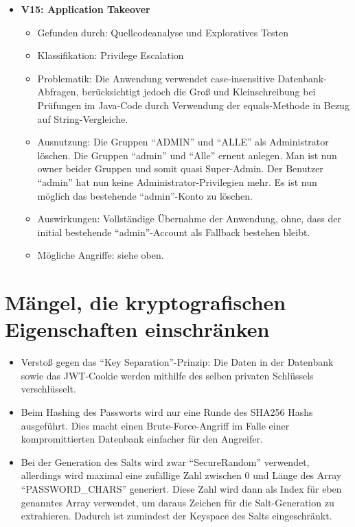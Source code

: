 \documentclass[12pt,DIV14,BCOR10mm,a4paper,parskip=half-,headsepline,headinclude,english,ngerman,bibliography=totocnumbered]{scrreprt}
\begin{document}
\begin{itemize}
  \hypertarget{vulnerability15}{}
  \item \textbf{V15: Application Takeover}
  \begin{itemize}
  \item Gefunden durch: Quellcodeanalyse und Exploratives Testen
  \item Klassifikation: Privilege Escalation
  \item Problematik: Die Anwendung verwendet case-insensitive Datenbank-Abfragen, berücksichtigt jedoch die Groß und Kleinschreibung bei Prüfungen im Java-Code durch Verwendung der equals-Methode in Bezug auf String-Vergleiche. 
  \item Ausnutzung: Die Gruppen \enquote{ADMIN} und \enquote{ALLE} als Administrator löschen. Die Gruppen \enquote{admin} und \enquote{Alle} erneut anlegen. Man ist nun owner beider Gruppen und somit quasi Super-Admin. Der Benutzer \enquote{admin} hat nun keine Administrator-Privilegien mehr. Es ist nun möglich das bestehende \enquote{admin}-Konto zu löschen.
  \item Auswirkungen: Vollständige Übernahme der Anwendung, ohne, dass der initial bestehende \enquote{admin}-Account als Fallback bestehen bleibt.
  \item Mögliche Angriffe: siehe oben.
  \end{itemize}
\end{itemize}

\section{Mängel, die kryptografischen Eigenschaften einschränken}

\begin{itemize}
  \item Verstoß gegen das \enquote{Key Separation}-Prinzip: Die Daten in der Datenbank sowie das JWT-Cookie werden mithilfe des selben privaten Schlüssels verschlüsselt. 
  \item Beim Hashing des Passworts wird nur eine Runde des SHA256 Hashs ausgeführt. Dies macht einen Brute-Force-Angriff im Falle einer kompromittierten Datenbank einfacher für den Angreifer.
  \item Bei der Generation des Salts wird zwar \enquote{SecureRandom} verwendet, allerdings wird maximal eine zufällige Zahl zwischen 0 und Länge des Array \enquote{PASSWORD\_CHARS} generiert. Diese Zahl wird dann als Index für eben genanntes Array verwendet, um daraus Zeichen für die Salt-Generation zu extrahieren. Dadurch ist zumindest der Keyspace des Salts eingeschränkt.
\end{itemize}
\end{document}
